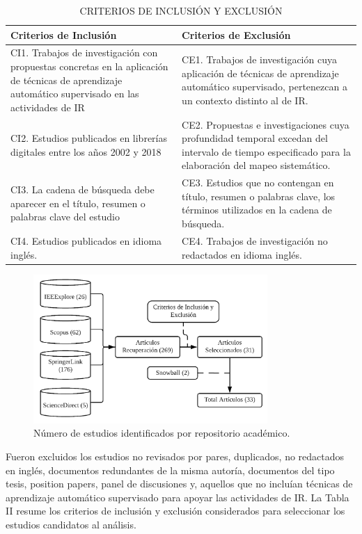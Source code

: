 \documentclass[journal]{IEEEtran}
\begin{document}
\begin{table}[!t]
\renewcommand{\arraystretch}{1.3}
\caption{CRITERIOS DE INCLUSIÓN Y EXCLUSIÓN}
\label{tabla2}
\centering
\begin{tabular}{p{3.5cm}p{4cm}}
\hline
\hline
Criterios de Inclusión & Criterios de Exclusión \\
\hline
CI1. Trabajos de investigación con propuestas concretas en la aplicación de técnicas de aprendizaje automático supervisado en las actividades de IR  & CE1. Trabajos de investigación cuya aplicación de técnicas de aprendizaje automático supervisado, pertenezcan a un contexto distinto al de IR.\\ \cline{1-2}
CI2. Estudios publicados en librerías digitales entre los años 2002 y 2018 & CE2. Propuestas e investigaciones
cuya profundidad temporal excedan del intervalo de tiempo especificado para la elaboración del mapeo sistemático. \\ \cline{1-2}
CI3. La cadena de búsqueda debe aparecer en el título, resumen o palabras clave del estudio & CE3. Estudios que no contengan en título, resumen o palabras clave, los términos utilizados en la cadena de búsqueda. \\ \cline{1-2}
CI4. Estudios publicados en idioma inglés. & CE4. Trabajos de investigación no redactados en idioma inglés. \\
\hline \hline                                                                                                    
\end{tabular}
\end{table}

\begin{figure}[!t]
\centering
\includegraphics[width=3.5in]{figures/figure4_Guada.png}
\caption{Número de estudios identificados por repositorio académico.}
\label{fig4}
\end{figure}

Fueron excluidos los estudios no revisados por pares, duplicados, no redactados en inglés, documentos redundantes de la misma autoría, documentos del tipo tesis, position papers, panel de discusiones y, aquellos que no incluían técnicas de aprendizaje automático supervisado para apoyar las actividades de IR. La Tabla II resume los criterios de inclusión y exclusión considerados para seleccionar los estudios candidatos al análisis.
\end{document}
